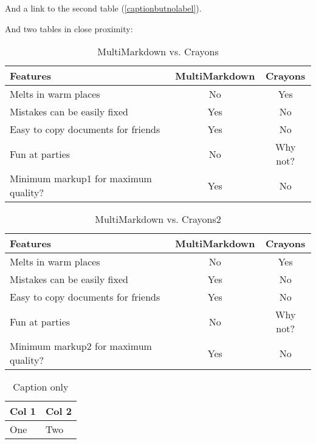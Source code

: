 And a link to the second table (\autoref{captionbutnolabel}).

And two tables in close proximity:

\begin{table}[htbp]
\begin{minipage}{\linewidth}
\setlength{\tymax}{0.5\linewidth}
\centering
\small
\caption{MultiMarkdown vs. Crayons}
\label{multimarkdownvs.crayons}
\begin{tabular}{@{}lcc@{}} \toprule
Features&MultiMarkdown&Crayons\\
\midrule
Melts in warm places&No&Yes\\
Mistakes can be easily fixed&Yes&No\\
Easy to copy documents for friends&Yes&No\\
Fun at parties&No&Why not?\\

\midrule
Minimum markup1 for maximum quality?&Yes&No\\

\bottomrule

\end{tabular}
\end{minipage}
\end{table}


\begin{table}[htbp]
\begin{minipage}{\linewidth}
\setlength{\tymax}{0.5\linewidth}
\centering
\small
\caption{MultiMarkdown vs. Crayons2}
\label{multimarkdownvs.crayons2}
\begin{tabular}{@{}lcc@{}} \toprule
Features&MultiMarkdown&Crayons\\
\midrule
Melts in warm places&No&Yes\\
Mistakes can be easily fixed&Yes&No\\
Easy to copy documents for friends&Yes&No\\
Fun at parties&No&Why not?\\

\midrule
Minimum markup2 for maximum quality?&Yes&No\\

\bottomrule

\end{tabular}
\end{minipage}
\end{table}


\begin{table}[htbp]
\begin{minipage}{\linewidth}
\setlength{\tymax}{0.5\linewidth}
\centering
\small
\caption{Caption only}
\label{captiononly}
\begin{tabular}{@{}ll@{}} \toprule
Col 1&Col 2\\
\midrule
One&Two \\

\bottomrule

\end{tabular}
\end{minipage}
\end{table}





